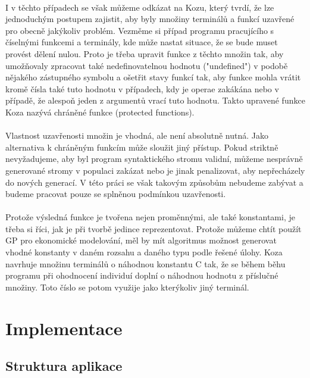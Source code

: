 \documentclass[bc,male,java,dept460]{diploma}		%
\begin{document}
\paragraph*{}
I v těchto případech se však můžeme odkázat na Kozu, který tvrdí, že lze jednoduchým postupem zajistit, aby byly množiny terminálů a funkcí uzavřené pro obecně jakýkoliv problém. Vezměme si případ programu pracujícího s číselnými funkcemi a terminály, kde může nastat situace, že se bude muset provést dělení nulou. Proto je třeba upravit funkce z těchto množin tak, aby umožňovaly zpracovat také nedefinovatelnou hodnotu ("undefined") v podobě nějakého zástupného symbolu a ošetřit stavy funkcí tak, aby funkce mohla vrátit kromě čísla také tuto hodnotu v případech, kdy je operae zakákána nebo v případě, že alespoň jeden z argumentů vrací tuto hodnotu. Takto upravené funkce Koza nazývá chráněné funkce (protected functions).

\paragraph*{}
Vlastnost uzavřenosti množin je vhodná, ale není absolutně nutná. Jako alternativa k chráněným funkcím může sloužit jiný přístup. Pokud striktně nevyžadujeme, aby byl program syntaktického stromu validní, můžeme nesprávně generované stromy v populaci zakázat nebo je jinak penalizovat, aby nepřecházely do nových generací. V této práci se však takovým způsobům nebudeme zabývat a budeme pracovat pouze se splněnou podmínkou uzavřenosti.

\paragraph*{}
Protože výsledná funkce je tvořena nejen proměnnými, ale také konstantami, je třeba si říci, jak je při tvorbě jedince reprezentovat. Protože můžeme chtít použít GP pro ekonomické modelování, měl by mít algoritmus možnost generovat vhodné konstanty v daném rozsahu a daného typu podle řešené úlohy. Koza navrhuje množinu terminálů o náhodnou konstantu C tak, že se během běhu programu při ohodnocení individuí doplní o náhodnou hodnotu z příslučné množiny. Toto číslo se potom využije jako kterýkoliv jiný terminál.

\section{Implementace}
\subsection{Struktura aplikace}
\end{document}
